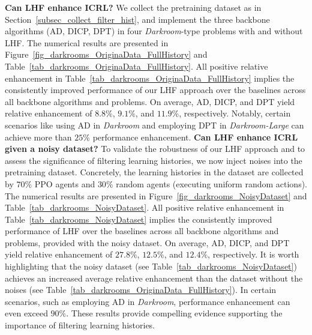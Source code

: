 \documentclass{article}
\begin{document}
\textbf{Can LHF enhance ICRL?}
We collect the pretraining dataset as in Section~\ref{subsec_collect_filter_hist}, and implement the three backbone algorithms (AD, DICP, DPT) in four \textit{Darkroom}-type problems with and without LHF.
The numerical results are presented in Figure~\ref{fig_darkrooms_OriginaData_FullHistory} and Table~\ref{tab_darkrooms_OriginaData_FullHistory}.
All positive relative enhancement in Table~\ref{tab_darkrooms_OriginaData_FullHistory} implies the consistently improved performance of our LHF approach over the baselines across all backbone algorithms and problems.
On average, AD, DICP, and DPT yield relative enhancement of $8.8\%$, $9.1\%$, and $11.9\%$, respectively. Notably, certain scenarios like using AD in \textit{Darkroom} and employing DPT in \textit{Darkroom-Large} can achieve more than $25\%$ performance enhancement.
\textbf{Can LHF enhance ICRL given a noisy dataset?}
To validate the robustness of our LHF approach and to assess the significance of filtering learning histories, we now inject noises into the pretraining dataset. Concretely, the learning histories in the dataset are collected by $70\%$ PPO agents and $30\%$ random agents (executing uniform random actions).
The numerical results are presented in Figure~\ref{fig_darkrooms_NoisyDataset} and Table~\ref{tab_darkrooms_NoisyDataset}.
All positive relative enhancement in Table~\ref{tab_darkrooms_NoisyDataset} implies the consistently improved performance of LHF over the baselines across all backbone algorithms and problems, provided with the noisy dataset.
On average, AD, DICP, and DPT yield relative enhancement of $27.8\%$, $12.5\%$, and $12.4\%$, respectively. It is worth highlighting that the noisy dataset (see Table~\ref{tab_darkrooms_NoisyDataset}) achieves an increased average relative enhancement than the dataset without the noises (see Table~\ref{tab_darkrooms_OriginaData_FullHistory}). In certain scenarios, such as employing AD in \textit{Darkroom}, performance enhancement can even exceed $90\%$. These results provide compelling evidence supporting the importance of filtering learning histories.
\end{document}
